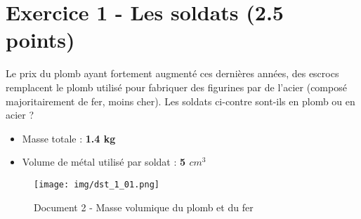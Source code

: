 \documentclass[answers]{exam}
\begin{document}
\section*{Exercice 1 - Les soldats (2.5 points)}

Le prix du plomb ayant fortement augmenté ces dernières années, des escrocs remplacent le plomb utilisé pour fabriquer des figurines par de l'acier (composé majoritairement de fer, moins cher). Les soldats ci-contre sont-ils en plomb ou en acier ?


\begin{tcolorbox}[colback=gray!10!white, colframe=gray, title=Document 1 - Caractéristiques d'un lot de \textbf{25} soldats de plomb]
  \begin{itemize}[noitemsep]
    \item Masse totale : \textbf{1.4 kg}
    \item Volume de métal utilisé par soldat : \textbf{5 $cm^3$}
  \end{itemize}
\end{tcolorbox}

\begin{figure}[H]
  \centering
  \texttt{[image: img/dst\_1\_01.png]}
  \captionsetup{labelformat=empty}
  \caption{\label{} Document 2 - Masse volumique du plomb et du fer}
\end{figure} 
\end{document}
